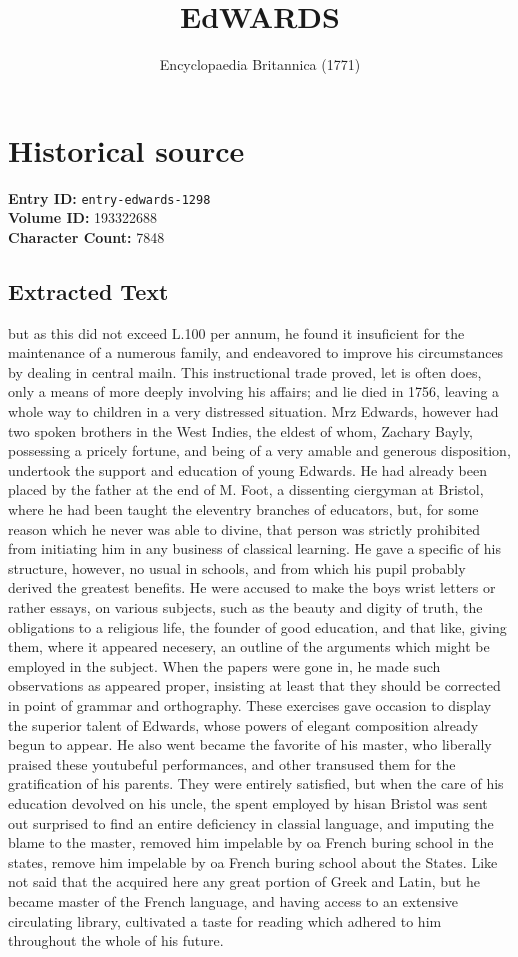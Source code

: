 \documentclass{article}
\title{EdWARDS}
\date{Encyclopaedia Britannica (1771)}
\begin{document}
\maketitle

\section*{Historical source}
\textbf{Entry ID:} \texttt{entry-edwards-1298} \\
\textbf{Volume ID:} 193322688 \\
\textbf{Character Count:} 7848

\subsection*{Extracted Text}
but as this did not exceed L.100 per annum, he found it insuficient for the maintenance of a numerous family, and endeavored to improve his circumstances by dealing in central mailn. This instructional trade proved, let is often does, only a means of more deeply involving his affairs; and lie died in 1756, leaving a whole way to children in a very distressed situation. Mrz Edwards, however had two spoken brothers in the West Indies, the eldest of whom, Zachary Bayly, possessing a pricely fortune, and being of a very amable and generous disposition, undertook the support and education of young Edwards. He had already been placed by the father at the end of M. Foot, a dissenting ciergyman at Bristol, where he had been taught the eleventry branches of educators, but, for some reason which he never was able to divine, that person was strictly prohibited from initiating him in any business of classical learning. He gave a specific of his structure, however, no usual in schools, and from which his pupil probably derived the greatest benefits. He were accused to make the boys wrist letters or rather essays, on various subjects, such as the beauty and digity of truth, the obligations to a religious life, the founder of good education, and that like, giving them, where it appeared necesery, an outline of the arguments which might be employed in the subject. When the papers were gone in, he made such observations as appeared proper, insisting at least that they should be corrected in point of grammar and orthography. These exercises gave occasion to display the superior talent of Edwards, whose powers of elegant composition already begun to appear. He also went became the favorite of his master, who liberally praised these youtubeful performances, and other transused them for the gratification of his parents. They were entirely satisfied, but when the care of his education devolved on his uncle, the spent employed by hisan Bristol was sent out surprised to find an entire deficiency in classial language, and imputing the blame to the master, removed him impelable by oa French buring school in the states, remove him impelable by oa French buring school about the States. Like not said that the acquired here any great portion of Greek and Latin, but he became master of the French language, and having access to an extensive circulating library, cultivated a taste for reading which adhered to him throughout the whole of his future.
\end{document}

